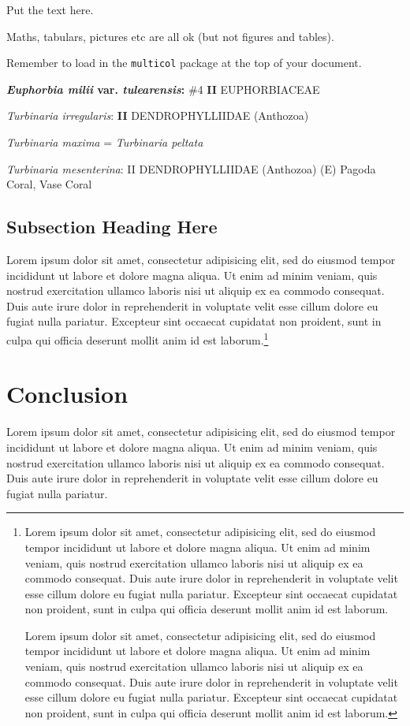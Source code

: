 
\begin{multicols}{2}{
Put the text here.

Maths, tabulars, pictures etc are all ok (but not
figures and tables).

Remember to load in the \texttt{multicol}
package at the top of your document.

\textbf{\textit{Euphorbia milii} var. \textit{tulearensis}:} \#4 \textbf{II} EUPHORBIACEAE

\textit{Turbinaria irregularis}: \textbf{II}  DENDROPHYLLIIDAE (Anthozoa)

\textit{Turbinaria maxima} = \textit{Turbinaria peltata}

\textit{Turbinaria mesenterina}: II  DENDROPHYLLIIDAE (Anthozoa) (E) Pagoda Coral, Vase Coral

}
\end{multicols}

\subsection{Subsection Heading Here}

Lorem ipsum dolor sit amet, consectetur adipisicing elit, sed do eiusmod tempor
incididunt ut labore et dolore magna aliqua. Ut enim ad minim veniam, quis
nostrud exercitation ullamco laboris nisi ut aliquip ex ea commodo consequat.
Duis aute irure dolor in reprehenderit in voluptate velit esse cillum dolore eu
fugiat nulla pariatur. Excepteur sint occaecat cupidatat non proident, sunt in
culpa qui officia deserunt mollit anim id est laborum.\footnote{Lorem ipsum dolor sit amet, consectetur adipisicing elit, sed do eiusmod tempor
incididunt ut labore et dolore magna aliqua. Ut enim ad minim veniam, quis
nostrud exercitation ullamco laboris nisi ut aliquip ex ea commodo consequat.
Duis aute irure dolor in reprehenderit in voluptate velit esse cillum dolore eu
fugiat nulla pariatur. Excepteur sint occaecat cupidatat non proident, sunt in
culpa qui officia deserunt mollit anim id est laborum.

Lorem ipsum dolor sit amet, consectetur adipisicing elit, sed do eiusmod tempor
incididunt ut labore et dolore magna aliqua. Ut enim ad minim veniam, quis
nostrud exercitation ullamco laboris nisi ut aliquip ex ea commodo consequat.
Duis aute irure dolor in reprehenderit in voluptate velit esse cillum dolore eu
fugiat nulla pariatur. Excepteur sint occaecat cupidatat non proident, sunt in
culpa qui officia deserunt mollit anim id est laborum.}


\section{Conclusion}

Lorem ipsum dolor sit amet, consectetur adipisicing elit, sed do eiusmod tempor
incididunt ut labore et dolore magna aliqua. Ut enim ad minim veniam, quis
nostrud exercitation ullamco laboris nisi ut aliquip ex ea commodo consequat.
Duis aute irure dolor in reprehenderit in voluptate velit esse cillum dolore eu
fugiat nulla pariatur.